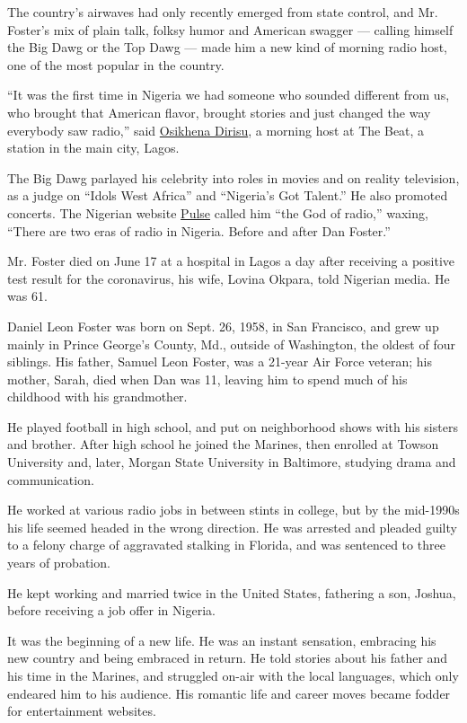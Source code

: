 The country's airwaves had only recently emerged from state control, and
Mr. Foster's mix of plain talk, folksy humor and American swagger ---
calling himself the Big Dawg or the Top Dawg --- made him a new kind of
morning radio host, one of the most popular in the country.

``It was the first time in Nigeria we had someone who sounded different
from us, who brought that American flavor, brought stories and just
changed the way everybody saw radio,'' said
\href{http://www.thebeat99.com/profile/osi}{Osikhena Dirisu}, a morning
host at The Beat, a station in the main city, Lagos.

The Big Dawg parlayed his celebrity into roles in movies and on reality
television, as a judge on ``Idols West Africa'' and ``Nigeria's Got
Talent.'' He also promoted concerts. The Nigerian website
\href{https://www.pulse.ng/news/local/a-tribute-to-dan-foster-the-god-of-radio-pulse-editors-opinion/3d0wynt}{Pulse}
called him ``the God of radio,'' waxing, ``There are two eras of radio
in Nigeria. Before and after Dan Foster.''

Mr. Foster died on June 17 at a hospital in Lagos a day after receiving
a positive test result for the coronavirus, his wife, Lovina Okpara,
told Nigerian media. He was 61.

Daniel Leon Foster was born on Sept. 26, 1958, in San Francisco, and
grew up mainly in Prince George's County, Md., outside of Washington,
the oldest of four siblings. His father, Samuel Leon Foster, was a
21-year Air Force veteran; his mother, Sarah, died when Dan was 11,
leaving him to spend much of his childhood with his grandmother.

He played football in high school, and put on neighborhood shows with
his sisters and brother. After high school he joined the Marines, then
enrolled at Towson University and, later, Morgan State University in
Baltimore, studying drama and communication.

He worked at various radio jobs in between stints in college, but by the
mid-1990s his life seemed headed in the wrong direction. He was arrested
and pleaded guilty to a felony charge of aggravated stalking in Florida,
and was sentenced to three years of probation.

He kept working and married twice in the United States, fathering a son,
Joshua, before receiving a job offer in Nigeria.

It was the beginning of a new life. He was an instant sensation,
embracing his new country and being embraced in return. He told stories
about his father and his time in the Marines, and struggled on-air with
the local languages, which only endeared him to his audience. His
romantic life and career moves became fodder for entertainment websites.

